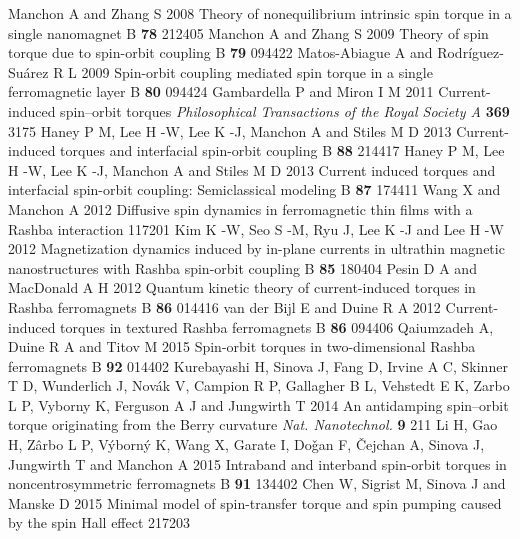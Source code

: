 \documentclass[12pt]{iopart}
\begin{document}
\begin{thebibliography}{99}
 Manchon A and Zhang S 2008 Theory of nonequilibrium intrinsic spin torque in a single nanomagnet \PR B {\bf 78} 212405
 Manchon A and Zhang S 2009 Theory of spin torque due to spin-orbit coupling \PR B {\bf 79} 094422
 Matos-Abiague A and Rodr\'{i}guez-Su\'{a}rez R L 2009 Spin-orbit coupling mediated spin torque in a single ferromagnetic layer \PR B {\bf 80} 094424
 Gambardella P and Miron I M 2011 Current-induced spin–orbit torques {\it Philosophical Transactions of the Royal Society A} {\bf 369} 3175
 Haney P M, Lee H -W, Lee K -J, Manchon A and Stiles M D 2013 Current-induced torques and interfacial spin-orbit coupling \PR B {\bf 88} 214417
 Haney P M, Lee H -W, Lee K -J, Manchon A and Stiles M D 2013 Current induced torques and interfacial spin-orbit coupling: Semiclassical modeling \PR B {\bf 87} 174411
 Wang X and Manchon A 2012 Diffusive spin dynamics in ferromagnetic thin films with a Rashba interaction  117201
 Kim K -W, Seo S -M, Ryu J, Lee K -J and Lee H -W 2012 Magnetization dynamics induced by in-plane currents in ultrathin magnetic nanostructures with Rashba spin-orbit coupling \PR B {\bf 85} 180404
 Pesin D A and MacDonald A H 2012 Quantum kinetic theory of current-induced torques in Rashba ferromagnets \PR B {\bf 86} 014416
	van der Bijl E and Duine R A 2012 Current-induced torques in textured Rashba ferromagnets \PR B {\bf 86} 094406
 Qaiumzadeh A, Duine R A and Titov M 2015 Spin-orbit torques in two-dimensional Rashba ferromagnets \PR B {\bf 92} 014402
 Kurebayashi H, Sinova J, Fang D, Irvine A C, Skinner T D, Wunderlich J, Novák V, Campion R P, Gallagher B L, Vehstedt E K, Zarbo L P, Vyborny K, Ferguson A J and Jungwirth T 2014 An antidamping spin–orbit torque originating from the Berry curvature {\it Nat. Nanotechnol.} {\bf 9} 211
 Li H, Gao H, Z\^{a}rbo L P, V\'{y}born\'{y} K, Wang X, Garate I, Do\v{g}an F, \v{C}ejchan A, Sinova J, Jungwirth T and Manchon A 2015 Intraband and interband spin-orbit torques in noncentrosymmetric ferromagnets \PR B {\bf 91} 134402
 Chen W, Sigrist M, Sinova J and Manske D 2015 Minimal model of spin-transfer torque and spin pumping caused by the spin Hall effect  217203



\end{thebibliography}
\end{document}
